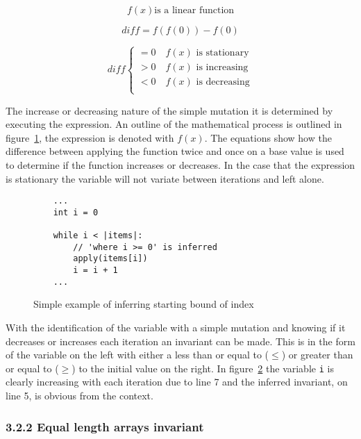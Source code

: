 \documentclass[11pt, a4paper, twoside, openright]{report}
\newcommand{\code}[1]{\texttt{#1}}
\begin{document}
\begin{figure}
    $$f(x) \text{is a linear function}$$

    $$diff = f(f(0)) - f(0)$$

    \[
        diff \begin{cases}
            = 0 \quad f(x) \text{ is stationary}\\
            > 0 \quad f(x) \text{ is increasing}\\
            < 0 \quad f(x) \text{ is decreasing}\\
        \end{cases}
    \]
\label{math:simple-mutation}
\end{figure}

The increase or decreasing nature of the simple mutation it is determined by
executing the expression. An outline of the mathematical process is outlined 
in figure~\ref{math:simple-mutation}, the expression is denoted with $f(x)$. 
The equations show how the difference between applying the function twice and once on a base value is used to
determine if the function increases or decreases.
In the case that the expression is stationary the variable will not variate
between iterations and left alone.

\begin{figure}[h]
\begin{lstlisting}
    ...
    int i = 0

    while i < |items|:
        // 'where i >= 0' is inferred
        apply(items[i])
        i = i + 1
    ...
\end{lstlisting}
\caption{Simple example of inferring starting bound of index}
\label{lst:whiley-start}
\end{figure}

With the identification of the variable with a simple mutation and knowing
if it decreases or increases each iteration an invariant can be made.
This is in the form of the variable on the left with either a less than or
equal to ($\leq$) or greater than or equal to ($\geq$) to the initial value on the
right.
In figure~\ref{lst:whiley-start} the variable \code{i} is clearly increasing
with each iteration due to line 7 and the inferred invariant, on line 5, is
obvious from the context.

\subsubsection*{3.2.2 Equal length arrays invariant}
\end{document}
